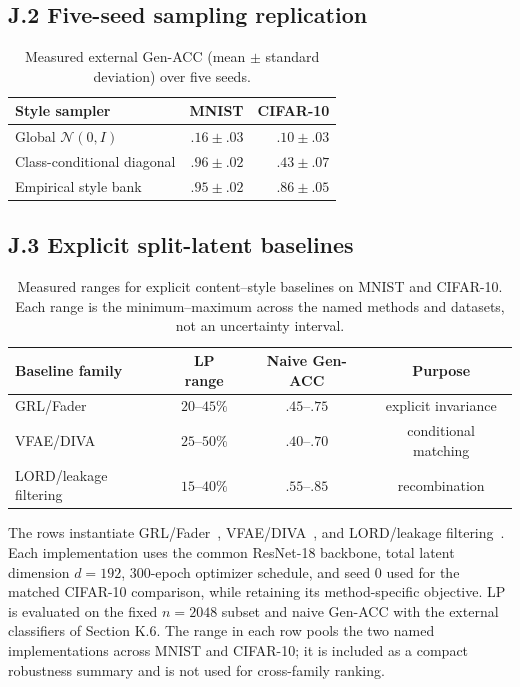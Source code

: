 \documentclass[letterpaper]{article} %
\begin{document}
\subsection{J.2 Five-seed sampling replication}

\begin{table}[h]
\centering
\scriptsize
\setlength{\tabcolsep}{4pt}
\caption{Measured external Gen-ACC (mean $\pm$ standard deviation) over
five seeds.}
\label{tab:sampling-five-seed}
\begin{tabular}{lrr}
\toprule
Style sampler & MNIST & CIFAR-10 \\
\midrule
Global $\mathcal N(0,I)$ & $.16\pm.03$ & $.10\pm.03$ \\
Class-conditional diagonal & $.96\pm.02$ & $.43\pm.07$ \\
Empirical style bank & $.95\pm.02$ & $.86\pm.05$ \\
\bottomrule
\end{tabular}
\end{table}

\subsection{J.3 Explicit split-latent baselines}

\begin{table}[h]

\centering
\scriptsize
\setlength{\tabcolsep}{3pt}
\caption{Measured ranges for explicit content--style baselines on MNIST and
CIFAR-10. Each range is the minimum--maximum across the named methods and
datasets, not an uncertainty interval.}
\label{tab:split-baselines}
\begin{tabular}{lccc}
\toprule
Baseline family & LP range & Naive Gen-ACC & Purpose \\
\midrule
GRL/Fader & $20$--$45\%$ & $.45$--$.75$ & explicit invariance \\
VFAE/DIVA & $25$--$50\%$ & $.40$--$.70$ & conditional matching \\
LORD/leakage filtering & $15$--$40\%$ & $.55$--$.85$ & recombination \\
\bottomrule
\end{tabular}
\end{table}

The rows instantiate GRL/Fader~\citep{ganin2015unsupervised,lample2017fader},
VFAE/DIVA~\citep{louizos2015variational,ilse2020diva}, and LORD/leakage
filtering~\citep{gabbay2020lord,ridgeway2018leakage}. Each implementation uses
the common ResNet-18 backbone, total latent
dimension $d{=}192$, 300-epoch optimizer schedule, and seed 0 used for the
matched CIFAR-10 comparison, while retaining its method-specific objective.
LP is evaluated on the fixed $n{=}2048$ subset and naive Gen-ACC with the
external classifiers of Section K.6. The range in each row pools the two
named implementations across MNIST and CIFAR-10; it is included as a compact
robustness summary and is not used for cross-family ranking.
\end{document}
